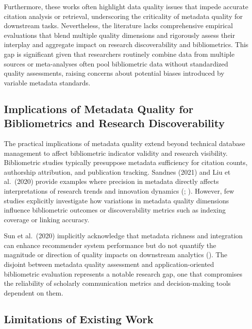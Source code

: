 \documentclass[
  12pt,
]{article}
\begin{document}
Furthermore, these works often highlight data quality issues that impede
accurate citation analysis or retrieval, underscoring the criticality of
metadata quality for downstream tasks. Nevertheless, the literature
lacks comprehensive empirical evaluations that blend multiple quality
dimensions and rigorously assess their interplay and aggregate impact on
research discoverability and bibliometrics. This gap is significant
given that researchers routinely combine data from multiple sources or
meta-analyses often pool bibliometric data without standardized quality
assessments, raising concerns about potential biases introduced by
variable metadata standards.

\subsection{Implications of Metadata Quality for Bibliometrics and
Research
Discoverability}\label{implications-of-metadata-quality-for-bibliometrics-and-research-discoverability}

The practical implications of metadata quality extend beyond technical
database management to affect bibliometric indicator validity and
research visibility. Bibliometric studies typically presuppose metadata
sufficiency for citation counts, authorship attribution, and publication
tracking. Sandnes (2021) and Liu et al.~(2020) provide examples where
precision in metadata directly affects interpretations of research
trends and innovation dynamics (; ). However, few studies
explicitly investigate how variations in metadata quality dimensions
influence bibliometric outcomes or discoverability metrics such as
indexing coverage or linking accuracy.

Sun et al.~(2020) implicitly acknowledge that metadata richness and
integration can enhance recommender system performance but do not
quantify the magnitude or direction of quality impacts on downstream
analytics (). The disjoint
between metadata quality assessment and application-oriented
bibliometric evaluation represents a notable research gap, one that
compromises the reliability of scholarly communication metrics and
decision-making tools dependent on them.

\subsection{Limitations of Existing
Work}\label{limitations-of-existing-work}
\end{document}
